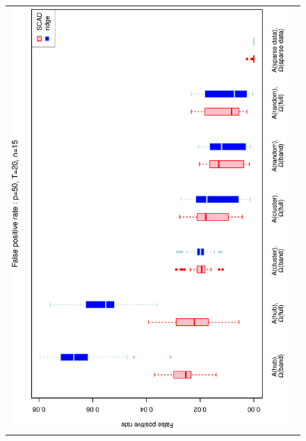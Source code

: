 \documentclass[a4paper]{article}
\begin{document}
\begin{figure}[h!]
\centering
\begin{tabular}{cc}
\includegraphics[scale=0.5,angle=270]{ROCfpr50T20N15a.eps}\\

\end{tabular}
\end{figure}
\end{document}
